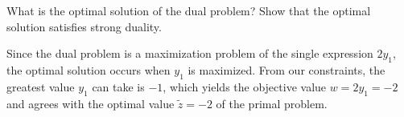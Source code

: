 What is the optimal solution of the dual problem? Show that the optimal solution satisfies strong
duality.

\begin{solution}
  Since the dual problem is a maximization problem of the single expression $2y_1$, the optimal solution occurs when 
  $y_1$ is maximized. From our constraints, the greatest value $y_1$ can take is $-1$, which yields the objective value 
  $w = 2y_1 = -2$ and agrees with the optimal value $\tilde{z} = -2$ of the primal problem.
\end{solution}
